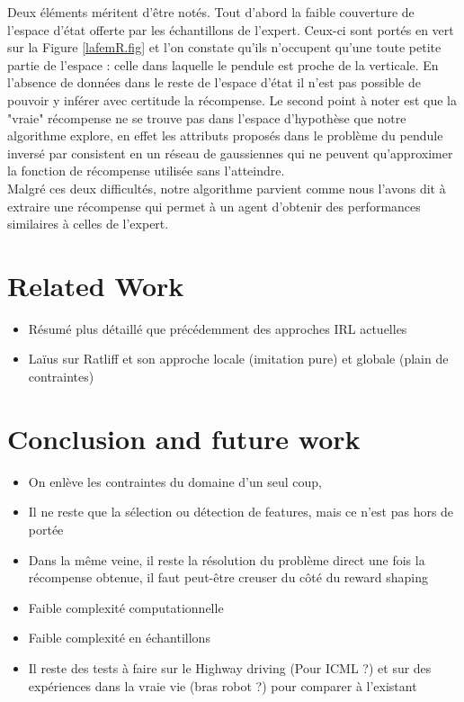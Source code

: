 \documentclass[publibook-draft]{CAp2012}
\begin{document}
Deux éléments méritent d'être notés. Tout d'abord la faible couverture de l'espace d'état offerte par les échantillons de l'expert. Ceux-ci sont portés en vert sur la Figure \ref{lafemR.fig} et l'on constate qu'ils n'occupent qu'une toute petite partie de l'espace : celle dans laquelle le pendule est proche de la verticale. En l'absence de données dans le reste de l'espace d'état il n'est pas possible de pouvoir y inférer avec certitude la récompense. Le second point à noter est que la "vraie" récompense ne se trouve pas dans l'espace d'hypothèse que notre algorithme explore, en effet les attributs proposés dans le problème du pendule inversé par \citet{lagoudakis2003least} consistent en un réseau de gaussiennes qui ne peuvent qu'approximer la fonction de récompense utilisée sans l'atteindre.\\

Malgré ces deux difficultés, notre algorithme parvient comme nous l'avons dit à extraire une récompense qui permet à un agent d'obtenir des performances similaires à celles de l'expert. 

\section{Related Work}
\begin{itemize}
\item Résumé plus détaillé que précédemment des approches IRL actuelles
\item Laïus sur Ratliff et son approche locale (imitation pure) et globale (plain de contraintes)
\end{itemize}
\section{Conclusion and future work}
\begin{itemize}
\item On enlève les contraintes du domaine d'un seul coup,
\item Il ne reste que la sélection ou détection de features, mais ce n'est pas hors de portée
\item Dans la même veine, il reste la résolution du problème direct une fois la récompense obtenue, il faut peut-être creuser du côté du reward shaping
\item Faible complexité computationnelle
\item Faible complexité en échantillons
\item Il reste des tests à faire sur le Highway driving (Pour ICML ?) et sur des expériences dans la vraie vie (bras robot ?) pour comparer à l'existant
\end{itemize}
%
%

\end{document}
